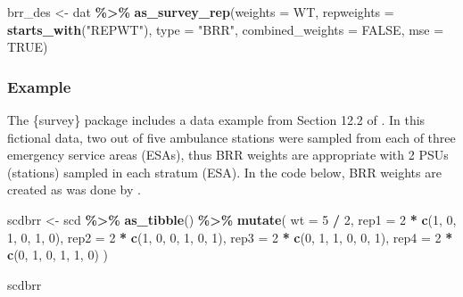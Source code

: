 \documentclass[
]{krantz}
\makeatletter
\newenvironment{Shaded}{\begin{snugshade}}{\end{snugshade}}
\newcommand{\AttributeTok}[1]{\textcolor[rgb]{0.27,0.27,0.27}{#1}}
\newcommand{\ConstantTok}[1]{\textcolor[rgb]{0.37,0.37,0.37}{#1}}
\newcommand{\DecValTok}[1]{\textcolor[rgb]{0.06,0.06,0.06}{#1}}
\newcommand{\FunctionTok}[1]{\textcolor[rgb]{0.27,0.27,0.27}{\textbf{#1}}}
\newcommand{\NormalTok}[1]{#1}
\newcommand{\OtherTok}[1]{\textcolor[rgb]{0.37,0.37,0.37}{#1}}
\newcommand{\SpecialCharTok}[1]{\textcolor[rgb]{0.43,0.43,0.43}{\textbf{#1}}}
\newcommand{\StringTok}[1]{\textcolor[rgb]{0.5,0.5,0.5}{#1}}
\newenvironment{kframe}{%
\medskip{}
\setlength{\fboxsep}{.8em}
 \def\at@end@of@kframe{}%
 \ifinner\ifhmode%
  \def\at@end@of@kframe{\end{minipage}}%
  \begin{minipage}{\columnwidth}%
 \fi\fi%
 \def\FrameCommand##1{\hskip\@totalleftmargin \hskip-\fboxsep
 \colorbox{shadecolor}{##1}\hskip-\fboxsep
     \hskip-\linewidth \hskip-\@totalleftmargin \hskip\columnwidth}%
 \MakeFramed {\advance\hsize-\width
   \@totalleftmargin\z@ \linewidth\hsize
   \@setminipage}}%
 {\par\unskip\endMakeFramed%
 \at@end@of@kframe}
\renewenvironment{Shaded}{\begin{kframe}}{\end{kframe}}
\makeatother
\begin{document}
\begin{Shaded}
\begin{Highlighting}[]
\NormalTok{brr\_des }\OtherTok{\textless{}{-}}\NormalTok{ dat }\SpecialCharTok{\%\textgreater{}\%}
  \FunctionTok{as\_survey\_rep}\NormalTok{(}\AttributeTok{weights =}\NormalTok{ WT,}
                \AttributeTok{repweights =} \FunctionTok{starts\_with}\NormalTok{(}\StringTok{"REPWT"}\NormalTok{),}
                \AttributeTok{type =} \StringTok{"BRR"}\NormalTok{,}
                \AttributeTok{combined\_weights =} \ConstantTok{FALSE}\NormalTok{,}
                \AttributeTok{mse =} \ConstantTok{TRUE}\NormalTok{)}
\end{Highlighting}
\end{Shaded}

\hypertarget{example-7}{%
\subsubsection*{Example}\label{example-7}}


The \{survey\} package includes a data example from Section 12.2 of \citet{levy2013sampling}. In this fictional data, two out of five ambulance stations were sampled from each of three emergency service areas (ESAs), thus BRR weights are appropriate with 2 PSUs (stations) sampled in each stratum (ESA). In the code below, BRR weights are created as was done by \citet{levy2013sampling}.

\begin{Shaded}
\begin{Highlighting}[]
\NormalTok{scdbrr }\OtherTok{\textless{}{-}}\NormalTok{ scd }\SpecialCharTok{\%\textgreater{}\%}
  \FunctionTok{as\_tibble}\NormalTok{() }\SpecialCharTok{\%\textgreater{}\%}
  \FunctionTok{mutate}\NormalTok{(}
    \AttributeTok{wt =} \DecValTok{5} \SpecialCharTok{/} \DecValTok{2}\NormalTok{,}
    \AttributeTok{rep1 =} \DecValTok{2} \SpecialCharTok{*} \FunctionTok{c}\NormalTok{(}\DecValTok{1}\NormalTok{, }\DecValTok{0}\NormalTok{, }\DecValTok{1}\NormalTok{, }\DecValTok{0}\NormalTok{, }\DecValTok{1}\NormalTok{, }\DecValTok{0}\NormalTok{),}
    \AttributeTok{rep2 =} \DecValTok{2} \SpecialCharTok{*} \FunctionTok{c}\NormalTok{(}\DecValTok{1}\NormalTok{, }\DecValTok{0}\NormalTok{, }\DecValTok{0}\NormalTok{, }\DecValTok{1}\NormalTok{, }\DecValTok{0}\NormalTok{, }\DecValTok{1}\NormalTok{),}
    \AttributeTok{rep3 =} \DecValTok{2} \SpecialCharTok{*} \FunctionTok{c}\NormalTok{(}\DecValTok{0}\NormalTok{, }\DecValTok{1}\NormalTok{, }\DecValTok{1}\NormalTok{, }\DecValTok{0}\NormalTok{, }\DecValTok{0}\NormalTok{, }\DecValTok{1}\NormalTok{),}
    \AttributeTok{rep4 =} \DecValTok{2} \SpecialCharTok{*} \FunctionTok{c}\NormalTok{(}\DecValTok{0}\NormalTok{, }\DecValTok{1}\NormalTok{, }\DecValTok{0}\NormalTok{, }\DecValTok{1}\NormalTok{, }\DecValTok{1}\NormalTok{, }\DecValTok{0}\NormalTok{)}
\NormalTok{  )}

\NormalTok{scdbrr}
\end{Highlighting}
\end{Shaded}
\end{document}
